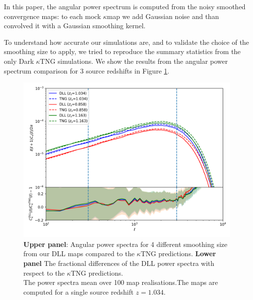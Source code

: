 \documentclass[twocolumn,twocolappendix]{aastex63}
\begin{document}
In this paper, the angular power spectrum is computed from the noisy smoothed convergence maps: to each mock $\kappa$map we add Gaussian noise and than convolved it with a Gaussian smoothing kernel.


To understand how accurate our simulations are, and to validate the choice of the smoothing size to apply, we tried to reproduce the summary statistics from the only Dark $\kappa$TNG simulations. 
 We show the results from the angular power spectrum comparison for 3 source redshifts in Figure \ref{fig:clsktng_comp1arc}.
\begin{figure}
    \centering
    \includegraphics[width=\columnwidth]{paper/figures/clsktng_comp1arc.png}
    \caption{
    \textbf{Upper panel}: Angular power spectra for 4 different smoothing size from
our DLL maps compared to the $\kappa$TNG predictions.
 \textbf{Lower panel}
The fractional differences of the DLL power spectra with respect to the $\kappa$TNG predictions. \\
 The power spectra mean over 100 map realisations.The maps are computed for a single source redshift $z=1.034$. }
    \label{fig:clsktng_comp1arc}
\end{figure}
\end{document}
